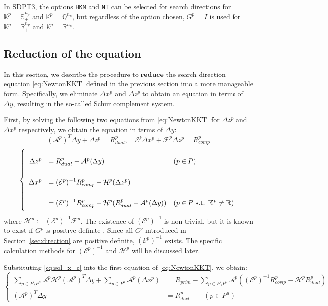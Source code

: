 \documentclass{scrartcl}
\begin{document}
\medskip

In SDPT3, the options \texttt{HKM} and \texttt{NT} can be selected for search directions for $\mathbb{K}^p = \mathbb{S}^{n_p}_+$ and $\mathbb{K}^p = \mathbb{Q}^{n_p}$, but regardless of the option chosen, $G^p = I$ is used for $\mathbb{K}^p = \mathbb{R}^{n_p}_+$ and $\mathbb{K}^p = \mathbb{R}^{n_p}$.
\medskip



\subsection{Reduction of the equation}
In this section, we describe the procedure to \textbf{reduce} the search direction equation \eqref{eq:NewtonKKT} defined in the previous section into a more manageable form. Specifically, we eliminate $\Delta x^p$ and $\Delta z^p$ to obtain an equation in terms of $\Delta y$, resulting in the so-called Schur complement system.

First, by solving the following two equations from \eqref{eq:NewtonKKT} for $\Delta z^p$ and $\Delta x^p$ respectively, we obtain the equation in terms of $\Delta y$:
\[
  (\mathcal{A}^p)^T \Delta y + \Delta z^p = R_{dual}^p,
  \quad
  \mathcal{E}^p \Delta x^p + \mathcal{F}^p \Delta z^p = R_{comp}^p
\]
\[
    \everymath{\displaystyle}
    \renewcommand{\arraystretch}{2.5}
    \left\{
    \begin{array}{rll}
    \Delta z^p &= R_{dual}^p - \mathcal{A}^p(\Delta y)  & (p\in P)\\
    \Delta x^p &= (\mathcal{E}^p)^{-1}R_{comp}^p - \mathcal{H}^p(\Delta z^p) \\
               &= (\mathcal{E}^p)^{-1}R_{comp}^p - \mathcal{H}^p(R_{dual}^p - \mathcal{A}^p(\Delta y))  & (p\in P \text{ s.t. } \mathbb{K}^p \neq \mathbb{R})
   \end{array}
   \right.
   \label{eq:sol_x_z}
\]
where $\mathcal{H}^p := (\mathcal{E}^p)^{-1}\mathcal{F}^p$. The existence of $(\mathcal{E}^p)^{-1}$ is non-trivial, but it is known to exist if $G^p$ is positive definite \cite{todd1998}. Since all $G^p$ introduced in Section~\ref{sec:direction} are positive definite, $(\mathcal{E}^p)^{-1}$ exists. The specific calculation methods for $(\mathcal{E}^p)^{-1}$ and $\mathcal{H}^p$ will be discussed later.

Substituting \eqref{eq:sol_x_z} into the first equation of \eqref{eq:NewtonKKT}, we obtain:
\[
    \left\{
    \begin{aligned}
        \sum_{p \in P\setminus P^u} \mathcal{A}^p\mathcal{H}^p(\mathcal{A}^p)^T\Delta y + \sum_{p \in P^u} \mathcal{A}^p(\Delta x^p) 
            &= R_{prim} - \sum_{p \in P\setminus P^u} \mathcal{A}^p((\mathcal{E}^p)^{-1}R_{comp}^p - \mathcal{H}^p R_{dual}^p) \\
        (\mathcal{A}^p)^T \Delta y 
            &= R^p_{dual} \qquad (p\in P^u)
    \end{aligned}
    \right.
    \label{eq:Schur_complement}
\]
\end{document}
